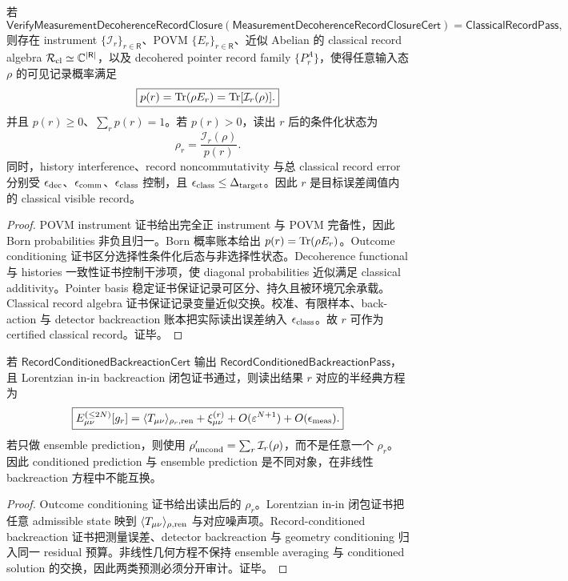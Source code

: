 \begin{theorem}\label{thm:typed-address-biaxial-completion-measurement-decoherence-record-closure-soundness}
若
\[
\mathsf{VerifyMeasurementDecoherenceRecordClosure}
(\mathsf{MeasurementDecoherenceRecordClosureCert})
=
\mathsf{ClassicalRecordPass},
\]
则存在 instrument \(\{\mathcal I_r\}_{r\in\mathsf R}\)、POVM \(\{E_r\}_{r\in\mathsf R}\)、近似 Abelian 的 classical record algebra \(\mathcal R_{\rm cl}\simeq\mathbb C^{|\mathsf R|}\)，以及 decohered pointer record family \(\{P_r^A\}\)，使得任意输入态 \(\rho\) 的可见记录概率满足
\[
\boxed{
p(r)
=
{\rm Tr}(\rho E_r)
=
{\rm Tr}[\mathcal I_r(\rho)].
}
\]
并且 \(p(r)\ge0\)、\(\sum_rp(r)=1\)。若 \(p(r)>0\)，读出 \(r\) 后的条件化状态为
\[
\rho_r=\frac{\mathcal I_r(\rho)}{p(r)}.
\]
同时，history interference、record noncommutativity 与总 classical record error 分别受 \(\epsilon_{\rm dec}\)、\(\epsilon_{\rm comm}\)、\(\epsilon_{\rm class}\) 控制，且 \(\epsilon_{\rm class}\le\Delta_{\rm target}\)。因此 \(r\) 是目标误差阈值内的 classical visible record。
\end{theorem}
\begin{proof}
POVM instrument 证书给出完全正 instrument 与 POVM 完备性，因此 Born probabilities 非负且归一。Born 概率账本给出 \(p(r)={\rm Tr}(\rho E_r)\)。Outcome conditioning 证书区分选择性条件化后态与非选择性状态。Decoherence functional 与 histories 一致性证书控制干涉项，使 diagonal probabilities 近似满足 classical additivity。Pointer basis 稳定证书保证记录可区分、持久且被环境冗余承载。Classical record algebra 证书保证记录变量近似交换。校准、有限样本、back-action 与 detector backreaction 账本把实际读出误差纳入 \(\epsilon_{\rm class}\)。故 \(r\) 可作为 certified classical record。证毕。
\end{proof}

\begin{theorem}\label{thm:typed-address-biaxial-completion-record-conditioned-semiclassical-prediction-soundness}
若 \(\mathsf{RecordConditionedBackreactionCert}\) 输出 \(\mathsf{RecordConditionedBackreactionPass}\)，且 Lorentzian in-in backreaction 闭包证书通过，则读出结果 \(r\) 对应的半经典方程为
\[
\boxed{
E_{\mu\nu}^{(\le2N)}[g_r]
=
\langle T_{\mu\nu}\rangle_{\rho_r,{\rm ren}}
+\xi_{\mu\nu}^{(r)}
+O(\varepsilon^{N+1})
+O(\epsilon_{\rm meas}).
}
\]
若只做 ensemble prediction，则使用 \(\rho'_{\rm uncond}=\sum_r\mathcal I_r(\rho)\)，而不是任意一个 \(\rho_r\)。因此 conditioned prediction 与 ensemble prediction 是不同对象，在非线性 backreaction 方程中不能互换。
\end{theorem}
\begin{proof}
Outcome conditioning 证书给出读出后的 \(\rho_r\)。Lorentzian in-in 闭包证书把任意 admissible state 映到 \(\langle T_{\mu\nu}\rangle_{\rho,{\rm ren}}\) 与对应噪声项。Record-conditioned backreaction 证书把测量误差、detector backreaction 与 geometry conditioning 归入同一 residual 预算。非线性几何方程不保持 ensemble averaging 与 conditioned solution 的交换，因此两类预测必须分开审计。证毕。
\end{proof}

